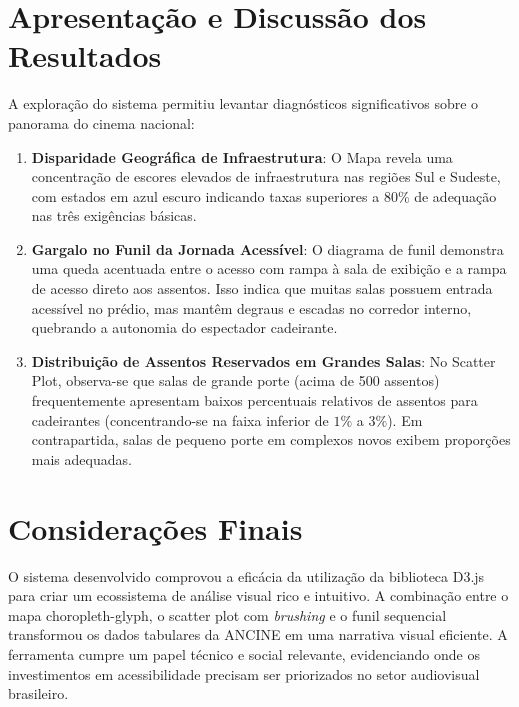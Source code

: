 \documentclass[12pt]{article}
\begin{document}
\section{Apresentação e Discussão dos Resultados}

A exploração do sistema permitiu levantar diagnósticos significativos sobre o panorama do cinema nacional:

\begin{enumerate}
    \item \textbf{Disparidade Geográfica de Infraestrutura}: O Mapa revela uma concentração de escores elevados de infraestrutura nas regiões Sul e Sudeste, com estados em azul escuro indicando taxas superiores a 80\% de adequação nas três exigências básicas.
    \item \textbf{Gargalo no Funil da Jornada Acessível}: O diagrama de funil demonstra uma queda acentuada entre o acesso com rampa à sala de exibição e a rampa de acesso direto aos assentos. Isso indica que muitas salas possuem entrada acessível no prédio, mas mantêm degraus e escadas no corredor interno, quebrando a autonomia do espectador cadeirante.
    \item \textbf{Distribuição de Assentos Reservados em Grandes Salas}: No Scatter Plot, observa-se que salas de grande porte (acima de 500 assentos) frequentemente apresentam baixos percentuais relativos de assentos para cadeirantes (concentrando-se na faixa inferior de $1\%$ a $3\%$). Em contrapartida, salas de pequeno porte em complexos novos exibem proporções mais adequadas.
\end{enumerate}

\section{Considerações Finais}

O sistema desenvolvido comprovou a eficácia da utilização da biblioteca D3.js 
para criar um ecossistema de análise visual rico e intuitivo. A combinação entre 
o mapa choropleth-glyph, o scatter plot com \textit{brushing} e o funil sequencial 
transformou os dados tabulares da ANCINE em uma narrativa visual eficiente. 
A ferramenta cumpre um papel técnico e social relevante, evidenciando onde os 
investimentos em acessibilidade precisam ser priorizados no setor audiovisual brasileiro.
\end{document}
